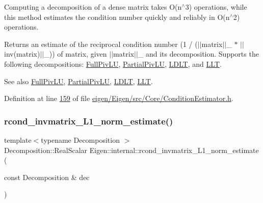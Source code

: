 Computing a decomposition of a dense matrix takes O(n$^\wedge$3) operations, while this method estimates the condition number quickly and reliably in O(n$^\wedge$2) operations.

\begin{DoxyReturn}{Returns}
an estimate of the reciprocal condition number (1 / ($\vert$$\vert$matrix$\vert$$\vert$\+\_ $\ast$ $\vert$$\vert$inv(matrix)$\vert$$\vert$\+\_)) of matrix, given $\vert$$\vert$matrix$\vert$$\vert$\+\_ and its decomposition. Supports the following decompositions\+: \hyperlink{group___l_u___module_class_eigen_1_1_full_piv_l_u}{Full\+Piv\+LU}, \hyperlink{group___l_u___module_class_eigen_1_1_partial_piv_l_u}{Partial\+Piv\+LU}, \hyperlink{group___cholesky___module_class_eigen_1_1_l_d_l_t}{L\+D\+LT}, and \hyperlink{group___cholesky___module_class_eigen_1_1_l_l_t}{L\+LT}.
\end{DoxyReturn}
\begin{DoxySeeAlso}{See also}
\hyperlink{group___l_u___module_class_eigen_1_1_full_piv_l_u}{Full\+Piv\+LU}, \hyperlink{group___l_u___module_class_eigen_1_1_partial_piv_l_u}{Partial\+Piv\+LU}, \hyperlink{group___cholesky___module_class_eigen_1_1_l_d_l_t}{L\+D\+LT}, \hyperlink{group___cholesky___module_class_eigen_1_1_l_l_t}{L\+LT}. 
\end{DoxySeeAlso}


Definition at line \hyperlink{eigen_2_eigen_2src_2_core_2_condition_estimator_8h_source_l00159}{159} of file \hyperlink{eigen_2_eigen_2src_2_core_2_condition_estimator_8h_source}{eigen/\+Eigen/src/\+Core/\+Condition\+Estimator.\+h}.

\mbox{\label{namespace_eigen_1_1internal_aa3f5b3cfa34df750994a247d4823aa51}} 
\subsubsection{\texorpdfstring{rcond\+\_\+invmatrix\+\_\+\+L1\+\_\+norm\+\_\+estimate()}{rcond\_invmatrix\_L1\_norm\_estimate()}}
{\footnotesize\ttfamily template$<$typename Decomposition $>$ \\
Decomposition\+::\+Real\+Scalar Eigen\+::internal\+::rcond\+\_\+invmatrix\+\_\+\+L1\+\_\+norm\+\_\+estimate (\begin{DoxyParamCaption}\item[{const Decomposition \&}]{dec }\end{DoxyParamCaption})}

